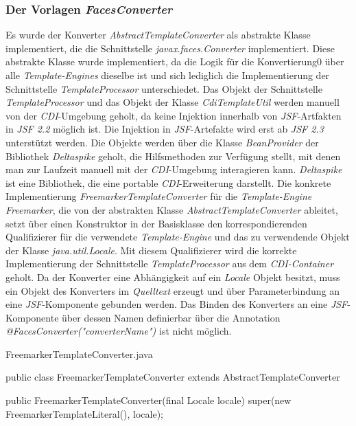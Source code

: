 \subsubsection{Der Vorlagen \emph{FacesConverter}}
Es wurde der Konverter \emph{AbstractTemplateConverter} als abstrakte Klasse implementiert, die die Schnittstelle \emph{javax.faces.Converter} implementiert. Diese abstrakte Klasse wurde implementiert, da die Logik für die Konvertierung0 über alle \emph{Template-Engines} dieselbe ist und sich lediglich die Implementierung der Schnittstelle \emph{TemplateProcessor} unterschiedet. Das Objekt der Schnittstelle \emph{TemplateProcessor} und das Objekt der Klasse \emph{CdiTemplateUtil} werden manuell von der \emph{CDI}-Umgebung geholt, da keine Injektion innerhalb von \emph{JSF}-Artfakten in \emph{JSF 2.2} möglich ist. Die Injektion in \emph{JSF}-Artefakte wird erst ab \emph{JSF 2.3} unterstützt werden. Die Objekte werden über die Klasse \emph{BeanProvider} der Bibliothek \emph{Deltaspike} geholt, die Hilfsmethoden zur Verfügung stellt, mit denen man zur Laufzeit manuell mit der \emph{CDI}-Umgebung interagieren kann. \emph{Deltaspike} ist eine Bibliothek, die eine portable \emph{CDI}-Erweiterung darstellt. 
\newline
\newline
Die konkrete Implementierung \emph{FreemarkerTemplateConverter} für die \emph{Template-Engine Freemarker}, die von der abstrakten Klasse \emph{AbstractTemplateConverter} ableitet, setzt über einen Konstruktor in der Basisklasse den korrespondierenden Qualifizierer für die verwendete \emph{Template-Engine} und das zu verwendende Objekt der Klasse \emph{java.util.Locale}. Mit diesem Qualifizierer wird die korrekte Implementierung der Schnittstelle \emph{TemplateProcessor} aus dem \emph{CDI-Container} geholt. Da der Konverter eine Abhängigkeit auf ein \emph{Locale} Objekt besitzt, muss ein Objekt des Konverters im \emph{Quelltext} erzeugt und über Parameterbindung an eine \emph{JSF}-Komponente gebunden werden. Das Binden des Konverters an eine \emph{JSF}-Komponente über dessen Namen definierbar über die Annotation \emph{@FacesConverter("converterName")} ist nicht möglich. 
\newpage
\begin{program}[h]
\caption{FreemarkerTemplateConverter.java}
\label{prog:freemarkerTemplateConverter}
\begin{JavaCode}
public class FreemarkerTemplateConverter 
                          extends AbstractTemplateConverter {

    public FreemarkerTemplateConverter(final Locale locale) {
        super(new FreemarkerTemplateLiteral(), locale);
    }
}
\end{JavaCode}
\end{program}
